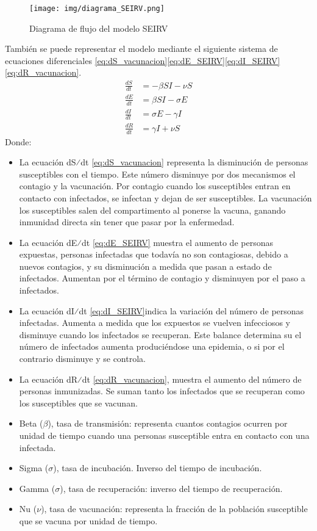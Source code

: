 \begin{figure}[H]
    \centering
    \texttt{[image: img/diagrama\_SEIRV.png]}
    \caption{Diagrama de flujo del modelo SEIRV}
    \label{fig:eje SEIRV}
    \vspace{0.5cm} %
\end{figure}
También se puede representar el modelo mediante el siguiente sistema de ecuaciones diferenciales \eqref{eq:dS_vacunacion}\eqref{eq:dE_SEIRV}\eqref{eq:dI_SEIRV}\eqref{eq:dR_vacunacion}.
\begin{align}
\frac{dS}{dt} &= -\beta SI - \nu S \label{eq:dS_vacunacion} \\
\frac{dE}{dt} &= \beta SI - \sigma E \label{eq:dE_SEIRV} \\
\frac{dI}{dt} &= \sigma E - \gamma I \label{eq:dI_SEIRV} \\
\frac{dR}{dt} &= \gamma I + \nu S \label{eq:dR_vacunacion}
\end{align}
Donde:
\begin{itemize}
    \item 	La ecuación dS⁄dt \eqref{eq:dS_vacunacion} representa la disminución de personas susceptibles con el tiempo. Este número disminuye por dos mecanismos el contagio y la vacunación. Por contagio cuando los susceptibles entran en contacto con infectados, se infectan y dejan de ser susceptibles. La vacunación los susceptibles salen del compartimento al ponerse la vacuna, ganando inmunidad directa sin tener que pasar por la enfermedad.
    \item 	La ecuación dE⁄dt \eqref{eq:dE_SEIRV} muestra el aumento de personas expuestas, personas infectadas que todavía no son contagiosas, debido a nuevos contagios, y su disminución a medida que pasan a estado de infectados. Aumentan por el término de contagio y disminuyen por el paso a infectados.
    \item 	La ecuación dI⁄dt \eqref{eq:dI_SEIRV}indica la variación del número de personas infectadas. Aumenta a medida que los expuestos se vuelven infecciosos y disminuye cuando los infectados se recuperan. Este balance determina su el número de infectados aumenta produciéndose una epidemia, o si por el contrario disminuye y se controla.
    \item La ecuación dR⁄dt \eqref{eq:dR_vacunacion}, muestra el aumento del número de personas inmunizadas. Se suman tanto los infectados que se recuperan como los susceptibles que se vacunan.
    \item 	Beta ($\beta$), tasa de transmisión: representa cuantos contagios ocurren por unidad de tiempo cuando una personas susceptible entra en contacto con una infectada.
    \item Sigma ($\sigma$), tasa de incubación. Inverso del tiempo de incubación.
    \item Gamma ($\sigma$), tasa de recuperación: inverso del tiempo de recuperación.
    \item 	Nu ($\nu$), tasa de vacunación: representa la fracción de la población susceptible que se vacuna por unidad de tiempo.
\end{itemize}

